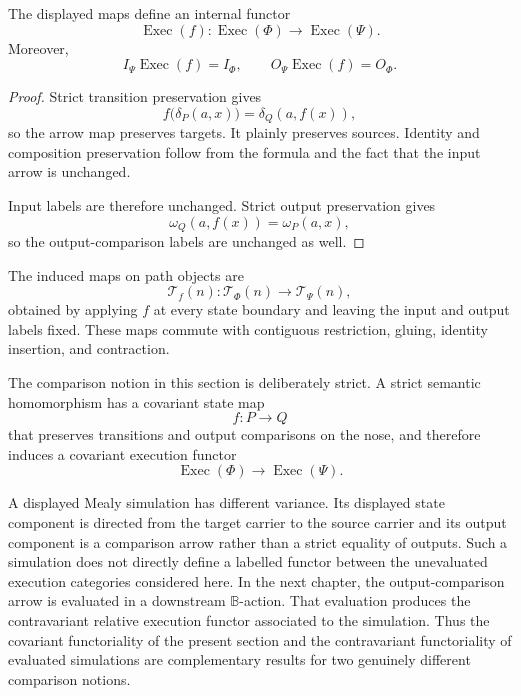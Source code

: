 \begin{proposition}
\label{prop:functoriality-execution-categories}
The displayed maps define an internal functor
\[
    \operatorname{Exec}(f):
    \operatorname{Exec}(\Phi)
    \to
    \operatorname{Exec}(\Psi).
\]
Moreover,
\[
    I_\Psi\operatorname{Exec}(f)=I_\Phi,
    \qquad
    O_\Psi\operatorname{Exec}(f)=O_\Phi.
\]
\end{proposition}

\begin{proof}
Strict transition preservation gives
\[
    f\bigl(\delta_P(a,x)\bigr)
    =
    \delta_Q(a,f(x)),
\]
so the arrow map preserves targets. It plainly preserves sources. Identity
and composition preservation follow from the formula and the fact that the
input arrow is unchanged.

Input labels are therefore unchanged. Strict output preservation gives
\[
    \omega_Q(a,f(x))
    =
    \omega_P(a,x),
\]
so the output-comparison labels are unchanged as well.
\end{proof}

The induced maps on path objects are
\[
    \mathscr T_f(n):
    \mathscr T_\Phi(n)
    \longrightarrow
    \mathscr T_\Psi(n),
\]
obtained by applying \(f\) at every state boundary and leaving the input and
output labels fixed. These maps commute with contiguous restriction, gluing,
identity insertion, and contraction.

\begin{remark}
\label{rem:temporal-strict-versus-simulation}
The comparison notion in this section is deliberately strict.  A strict
semantic homomorphism has a covariant state map
\[
    f:P\to Q
\]
that preserves transitions and output comparisons on the nose, and therefore
induces a covariant execution functor
\[
    \operatorname{Exec}(\Phi)\to\operatorname{Exec}(\Psi).
\]

A displayed Mealy simulation has different variance.  Its displayed state
component is directed from the target carrier to the source carrier and its
output component is a comparison arrow rather than a strict equality of
outputs.  Such a simulation does not directly define a labelled functor
between the unevaluated execution categories considered here.  In the next
chapter, the output-comparison arrow is evaluated in a downstream
\(\mathbb B\)-action.  That evaluation produces the contravariant relative
execution functor associated to the simulation.  Thus the covariant
functoriality of the present section and the contravariant functoriality of
evaluated simulations are complementary results for two genuinely different
comparison notions.
\end{remark}

